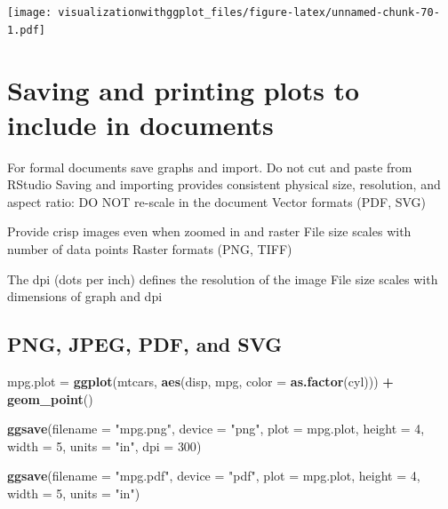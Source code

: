 \documentclass[]{krantz}
\makeatletter
\newenvironment{Shaded}{\begin{snugshade}}{\end{snugshade}}
\newcommand{\KeywordTok}[1]{\textcolor[rgb]{0.13,0.29,0.53}{\textbf{#1}}}
\newcommand{\DataTypeTok}[1]{\textcolor[rgb]{0.13,0.29,0.53}{#1}}
\newcommand{\DecValTok}[1]{\textcolor[rgb]{0.00,0.00,0.81}{#1}}
\newcommand{\StringTok}[1]{\textcolor[rgb]{0.31,0.60,0.02}{#1}}
\newcommand{\OperatorTok}[1]{\textcolor[rgb]{0.81,0.36,0.00}{\textbf{#1}}}
\newcommand{\NormalTok}[1]{#1}
\newenvironment{kframe}{%
\medskip{}
\setlength{\fboxsep}{.8em}
 \def\at@end@of@kframe{}%
 \ifinner\ifhmode%
  \def\at@end@of@kframe{\end{minipage}}%
  \begin{minipage}{\columnwidth}%
 \fi\fi%
 \def\FrameCommand##1{\hskip\@totalleftmargin \hskip-\fboxsep
 \colorbox{shadecolor}{##1}\hskip-\fboxsep
     \hskip-\linewidth \hskip-\@totalleftmargin \hskip\columnwidth}%
 \MakeFramed {\advance\hsize-\width
   \@totalleftmargin\z@ \linewidth\hsize
   \@setminipage}}%
 {\par\unskip\endMakeFramed%
 \at@end@of@kframe}
\renewenvironment{Shaded}{\begin{kframe}}{\end{kframe}}
\theoremstyle{definition}
\theoremstyle{definition}
\theoremstyle{definition}
\theoremstyle{remark}
\makeatother
\begin{document}
\texttt{[image: visualizationwithggplot\_files/figure-latex/unnamed-chunk-70-1.pdf]}

\section{Saving and printing plots to include in
documents}\label{saving-and-printing-plots-to-include-in-documents}

For formal documents save graphs and import. Do not cut and paste from
RStudio Saving and importing provides consistent physical size,
resolution, and aspect ratio: DO NOT re-scale in the document Vector
formats (PDF, SVG)

Provide crisp images even when zoomed in and raster File size scales
with number of data points Raster formats (PNG, TIFF)

The dpi (dots per inch) defines the resolution of the image File size
scales with dimensions of graph and dpi

\subsection{PNG, JPEG, PDF, and SVG}\label{png-jpeg-pdf-and-svg}

\begin{Shaded}
\begin{Highlighting}[]
\NormalTok{mpg.plot =}\StringTok{ }\KeywordTok{ggplot}\NormalTok{(mtcars, }
    \KeywordTok{aes}\NormalTok{(disp,  mpg, }\DataTypeTok{color =} \KeywordTok{as.factor}\NormalTok{(cyl))) }\OperatorTok{+}\StringTok{ }
\StringTok{    }\KeywordTok{geom_point}\NormalTok{()}

\KeywordTok{ggsave}\NormalTok{(}\DataTypeTok{filename =} \StringTok{"mpg.png"}\NormalTok{, }
    \DataTypeTok{device =} \StringTok{"png"}\NormalTok{,}
    \DataTypeTok{plot =}\NormalTok{ mpg.plot, }\DataTypeTok{height =} \DecValTok{4}\NormalTok{, }\DataTypeTok{width =} \DecValTok{5}\NormalTok{, }\DataTypeTok{units =} \StringTok{"in"}\NormalTok{, }
    \DataTypeTok{dpi =} \DecValTok{300}\NormalTok{)}

\KeywordTok{ggsave}\NormalTok{(}\DataTypeTok{filename =} \StringTok{"mpg.pdf"}\NormalTok{, }\DataTypeTok{device =} \StringTok{"pdf"}\NormalTok{, }
      \DataTypeTok{plot =}\NormalTok{ mpg.plot, }\DataTypeTok{height =} \DecValTok{4}\NormalTok{, }\DataTypeTok{width =} \DecValTok{5}\NormalTok{, }\DataTypeTok{units =} \StringTok{"in"}\NormalTok{)}
\end{Highlighting}
\end{Shaded}
\end{document}
